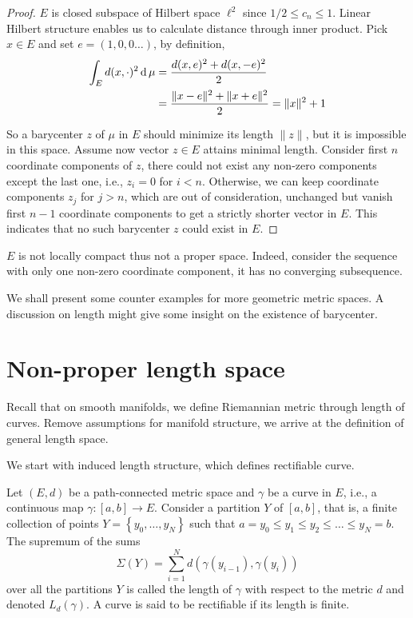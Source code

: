 \begin{proof}
	$E$ is closed subspace of Hilbert space $\ell^2$ since $ 1 / 2 \leq c_{n} \leq 1$.
	Linear Hilbert structure enables us to calculate distance through inner product.
	Pick $ x \in E$ and set $ e=(1,0,0\ldots)$, by definition,
	\begin{align*}
		\int_{E} d(x, \cdot)^2 \operatorname{d} \mu & = \frac{d(x,e)^2+d(x,-e)^2 }{2}                         \\
		                                 & =\frac{\| x - e \|^2 + \| x + e \|^2}{2} =\| x \|^2 + 1
	\end{align*}

	So a barycenter $z$ of $\mu$ in $E$ should minimize its length $\| z \|$,
	but it is impossible in this space.
	Assume now vector $z \in E$ attains minimal length.
	Consider first $n$ coordinate components of $z$,
	there could not exist any non-zero components except the last one, i.e., $z_i =0$ for $i<n$.
	Otherwise, we can keep coordinate components $z_j$ for $j>n$, which are out of consideration, unchanged but vanish first $n-1$ coordinate components to get a strictly shorter vector in $E$.
	This indicates that no such barycenter $z$ could exist in $E$.
\end{proof}

\begin{rmk}
	$E$ is not locally compact thus not a proper space.
	Indeed, consider the sequence with only one non-zero coordinate component, it has no converging subsequence.
\end{rmk}

We shall present some counter examples for more geometric metric spaces.
A discussion on length might give some insight on the existence of barycenter.

\section{Non-proper length space}

Recall that on smooth manifolds, we define Riemannian metric through length of curves.
Remove assumptions for manifold structure, we arrive at the definition of general length space.

We start with induced length structure, which defines rectifiable curve.
\begin{defn}
	\label{defn:length_structure}
	Let \( ( E , d ) \) be a path-connected metric space and \( \gamma \) be a curve in \( E \),
	i.e., a continuous map \( \gamma: [ a , b ] \rightarrow E \).
	Consider a partition \( Y \) of \( [ a , b ] \), that is,
	a finite collection of points \( Y = \left\{ y _ { 0 } , \ldots , y _ { N } \right\} \)
	such that \( a = y _ { 0 } \leq y _ { 1 } \leq y _ { 2 } \leq \ldots \leq y _ { N } = b \).
	The supremum of the sums
	\[
		\Sigma ( Y ) = \sum _ { i = 1 } ^ { N } d \left( \gamma \left( y _ { i - 1 } \right) , \gamma \left( y _ { i } \right) \right)
	\]
	over all the partitions $Y$ is called the length of $\gamma$ with respect to the metric $d$ and denoted $L_d (\gamma)$.
	A curve is said to be rectifiable if its length is finite.
\end{defn}

